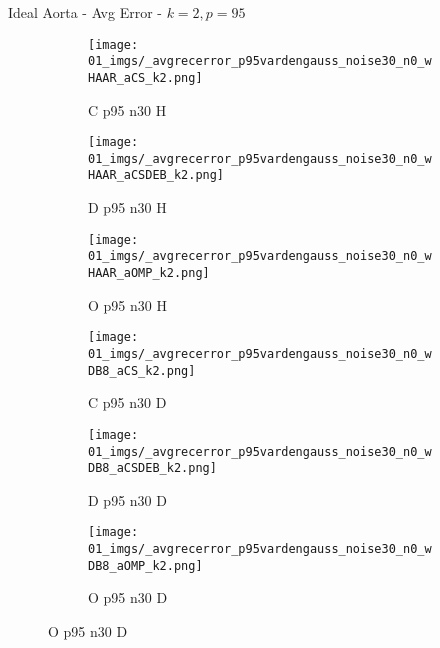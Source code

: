 \begin{frame}{Ideal Aorta - Avg Error - $k=2,p=95$}{}
\begin{figure}
\begin{subfigure}{0.13\textwidth}
\texttt{[image: 01\_imgs/\_avgrecerror\_p95vardengauss\_noise30\_n0\_wHAAR\_aCS\_k2.png]}
\caption*{\tiny C p95 n30 H}
\end{subfigure}
\begin{subfigure}{0.13\textwidth}
\texttt{[image: 01\_imgs/\_avgrecerror\_p95vardengauss\_noise30\_n0\_wHAAR\_aCSDEB\_k2.png]}
\caption*{\tiny D p95 n30 H}
\end{subfigure}
\begin{subfigure}{0.13\textwidth}
\texttt{[image: 01\_imgs/\_avgrecerror\_p95vardengauss\_noise30\_n0\_wHAAR\_aOMP\_k2.png]}
\caption*{\tiny O p95 n30 H}
\end{subfigure}
\begin{subfigure}{0.13\textwidth}
\texttt{[image: 01\_imgs/\_avgrecerror\_p95vardengauss\_noise30\_n0\_wDB8\_aCS\_k2.png]}
\caption*{\tiny C p95 n30 D}
\end{subfigure}
\begin{subfigure}{0.13\textwidth}
\texttt{[image: 01\_imgs/\_avgrecerror\_p95vardengauss\_noise30\_n0\_wDB8\_aCSDEB\_k2.png]}
\caption*{\tiny D p95 n30 D}
\end{subfigure}
\begin{subfigure}{0.13\textwidth}
\texttt{[image: 01\_imgs/\_avgrecerror\_p95vardengauss\_noise30\_n0\_wDB8\_aOMP\_k2.png]}
\caption*{\tiny O p95 n30 D}
\end{subfigure}
\end{figure}
\end{frame}


